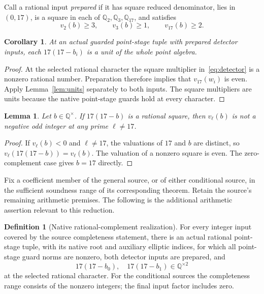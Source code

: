 \documentclass[11pt,a4paper]{article}
\newtheorem{lemma}[theorem]{Lemma}
\newtheorem{corollary}[theorem]{Corollary}
\theoremstyle{definition}\newtheorem{definition}[theorem]{Definition}
\newcommand{\Q}{\mathbb Q}\newcommand{\Z}{\mathbb Z}
\begin{document}
Call a rational input \emph{prepared} if it has square reduced
denominator, lies in $(0,17)$, is a square in each of
$\Q_2,\Q_3,\Q_{17}$, and satisfies
\[
v_2(b)\ge3,\qquad v_3(b)\ge1,\qquad v_{17}(b)\ge2.
\]

\begin{corollary}\label{cor:nativeunits}
At an actual guarded point-stage tuple with prepared detector inputs,
each $17(17-b_i)$ is a unit of the whole point algebra.
\end{corollary}
\begin{proof}
At the selected rational character the square multiplier
in~\eqref{eq:detector} is a nonzero rational number. Preparation
therefore implies that $v_{17}(w_i)$ is even. Apply
Lemma~\ref{lem:units} separately to both inputs. The square multipliers
are units because the native point-stage guards hold at every
character.
\end{proof}

\begin{lemma}\label{lem:valuation}
Let $b\in\Q^\times$. If $17(17-b)$ is a rational square, then
$v_\ell(b)$ is not a negative odd integer at any prime $\ell\ne17$.
\end{lemma}
\begin{proof}
If $v_\ell(b)<0$ and $\ell\ne17$, the valuations of $17$ and $b$
are distinct, so
$v_\ell(17(17-b))=v_\ell(b)$. The valuation of a nonzero square
is even. The zero-complement case gives $b=17$ directly.
\end{proof}

Fix a coefficient member of the general source, or of either
conditional source, in the sufficient soundness range of its
corresponding theorem. Retain the source's remaining arithmetic
premises. The following is the additional arithmetic assertion relevant
to this reduction.

\begin{definition}[Native rational-complement realization]
\label{def:target}
For every integer input covered by the source completeness statement,
there is an actual rational point-stage tuple, with its native root
and auxiliary elliptic indices, for which all point-stage guard norms
are nonzero, both detector inputs are prepared, and
\[
                    17(17-b_0),\quad17(17-b_1)\in\Q^{\times2}
\]
at the selected rational character. For the conditional sources the
completeness range consists of the nonzero integers; the final input
factor includes zero.
\end{definition}
\end{document}
